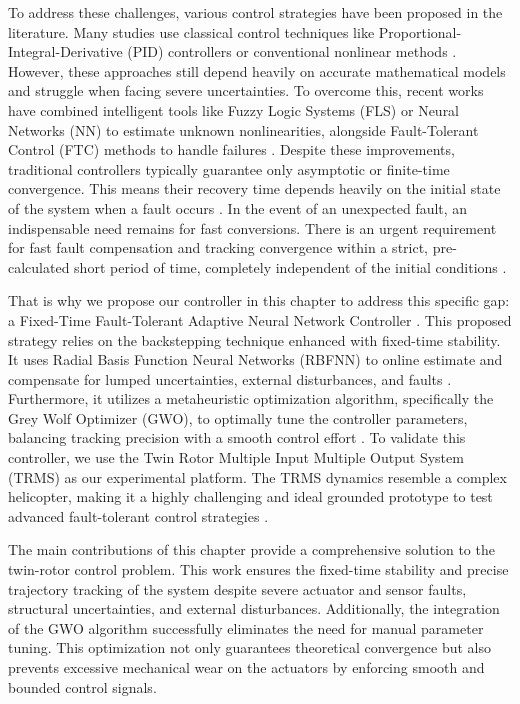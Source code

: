 To address these challenges, various control strategies have been proposed in the literature. Many studies use classical control techniques like Proportional-Integral-Derivative (PID) controllers or conventional nonlinear methods \cite{PID1, lqr1, Backstepping_Ref}. However, these approaches still depend heavily on accurate mathematical models and struggle when facing severe uncertainties. To overcome this, recent works have combined intelligent tools like Fuzzy Logic Systems (FLS) or Neural Networks (NN) to estimate unknown nonlinearities, alongside Fault-Tolerant Control (FTC) methods to handle failures \cite{rbfnn2, NN_Control_Ref, ftc1}. Despite these improvements, traditional controllers typically guarantee only asymptotic or finite-time convergence. This means their recovery time depends heavily on the initial state of the system when a fault occurs \cite{Bhat2000}. In the event of an unexpected fault, an indispensable need remains for fast conversions. There is an urgent requirement for fast fault compensation and tracking convergence within a strict, pre-calculated short period of time, completely independent of the initial conditions \cite{fxt, Zuo2018}.

That is why we propose our controller in this chapter to address this specific gap: a Fixed-Time Fault-Tolerant Adaptive Neural Network Controller \cite{my1article, Bacha2024}. This proposed strategy relies on the backstepping technique enhanced with fixed-time stability. It uses Radial Basis Function Neural Networks (RBFNN) to online estimate and compensate for lumped uncertainties, external disturbances, and faults \cite{Park1991, rbfnn1}. Furthermore, it utilizes a metaheuristic optimization algorithm, specifically the Grey Wolf Optimizer (GWO), to optimally tune the controller parameters, balancing tracking precision with a smooth control effort \cite{gwo, glida_thesis}. To validate this controller, we use the Twin Rotor Multiple Input Multiple Output System (TRMS) as our experimental platform. The TRMS dynamics resemble a complex helicopter, making it a highly challenging and ideal grounded prototype to test advanced fault-tolerant control strategies \cite{Juang2005, trms4}.

The main contributions of this chapter provide a comprehensive solution to the twin-rotor control problem. This work ensures the fixed-time stability and precise trajectory tracking of the system despite severe actuator and sensor faults, structural uncertainties, and external disturbances. Additionally, the integration of the GWO algorithm successfully eliminates the need for manual parameter tuning. This optimization not only guarantees theoretical convergence but also prevents excessive mechanical wear on the actuators by enforcing smooth and bounded control signals.

